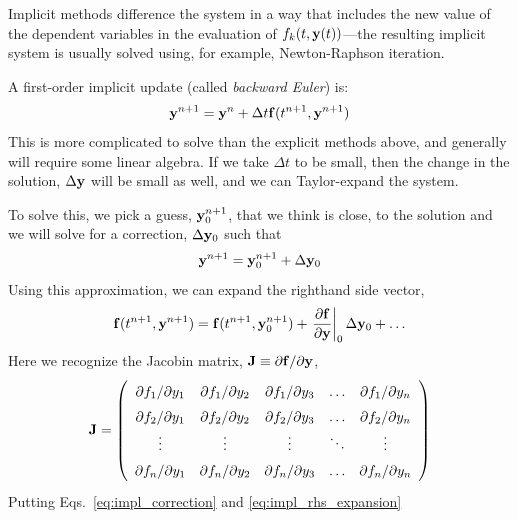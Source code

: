 Implicit methods difference the system in a way that includes the new
value of the dependent variables in the evaluation of $f_k(t,{\bf
  y}(t))$---the resulting implicit system is usually solved using, for
example, Newton-Raphson iteration.

A first-order implicit update
(called {\em backward Euler}) is:
\begin{equation}
  \label{eq:backwardeuler}
{\bf y}^{n+1} = {\bf y}^n + \Delta t {\bf f}(t^{n+1}, {\bf y}^{n+1})
\end{equation}
This is more complicated to solve than the explicit methods above, and
generally will require some linear algebra.  If we take $\Delta t$ to
be small, then the change in the solution, $\Delta {\bf y}$ will be
small as well, and we can Taylor-expand the system.

To solve this, we pick a guess, ${\bf y}^{n+1}_0$, that we think is
close, to the solution and we will solve for a correction, $\Delta
{\bf y}_0$ such that
\begin{equation}
\label{eq:impl_correction}
  {\bf y}^{n+1} = {\bf y}^{n+1}_0 + \Delta {\bf y}_0
\end{equation}
Using this approximation, we can expand the righthand side vector,
\begin{equation}
\label{eq:impl_rhs_expansion}
{\bf f}(t^{n+1},{\bf y}^{n+1}) = {\bf f}(t^{n+1}, {\bf y}^{n+1}_0) +
     \left . \frac{\partial {\bf f}}{\partial {\bf y}} \right |_0 \Delta {\bf y}_0 + \ldots
\end{equation}
Here we recognize the Jacobin matrix, ${\bf J} \equiv \partial {\bf
  f}/\partial {\bf y}$,
\begin{equation}
\renewcommand\arraystretch{1.5}
{\bf J} = \left (
\begin{array}{ccccc}
\partial f_1/\partial y_1 & \partial f_1/\partial y_2 &
\partial f_1/\partial y_3 & \ldots & \partial f_1/\partial y_n \\
%
\partial f_2/\partial y_1 & \partial f_2/\partial y_2 &
\partial f_2/\partial y_3 & \ldots & \partial f_2/\partial y_n \\
%
\vdots  & \vdots & \vdots & \ddots & \vdots \\
%
\partial f_n/\partial y_1 & \partial f_n/\partial y_2 &
\partial f_n/\partial y_3 & \ldots & \partial f_n/\partial y_n \\
\end{array}
\right )
\end{equation}
%
Putting Eqs.~\ref{eq:impl_correction} and \ref{eq:impl_rhs_expansion}
